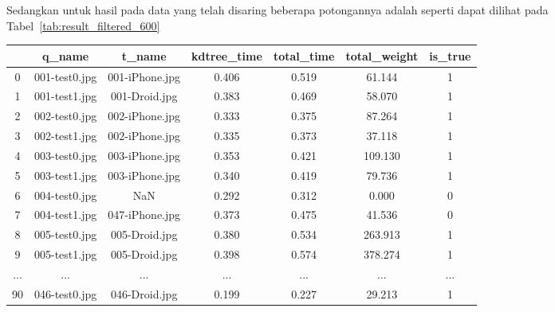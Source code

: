 Sedangkan untuk hasil pada data yang telah disaring beberapa potongannya adalah seperti dapat dilihat pada Tabel~\ref{tab:result_filtered_600}
\begin{table}[H]
	\centering
	\begin{tabular}{|c|c|c|c|c|c|c|} 
		\hline
		& \textbf{q\_name} & \textbf{t\_name} & \textbf{kdtree\_time} & \textbf{total\_time} & \textbf{total\_weight} & \textbf{is\_true}  \\ 
		\hline
		0   & 001-test0.jpg    & 001-iPhone.jpg   & 0.406                 & 0.519                & 61.144                 & 1                  \\ 
		\hline
		1   & 001-test1.jpg    & 001-Droid.jpg    & 0.383                 & 0.469                & 58.070                 & 1                  \\ 
		\hline
		2   & 002-test0.jpg    & 002-iPhone.jpg   & 0.333                 & 0.375                & 87.264                 & 1                  \\ 
		\hline
		3   & 002-test1.jpg    & 002-iPhone.jpg   & 0.335                 & 0.373                & 37.118                 & 1                  \\ 
		\hline
		4   & 003-test0.jpg    & 003-iPhone.jpg   & 0.353                 & 0.421                & 109.130                & 1                  \\ 
		\hline
		5   & 003-test1.jpg    & 003-iPhone.jpg   & 0.340                 & 0.419                & 79.736                 & 1                  \\ 
		\hline
		6   & 004-test0.jpg    & NaN              & 0.292                 & 0.312                & 0.000                  & 0                  \\ 
		\hline
		7   & 004-test1.jpg    & 047-iPhone.jpg   & 0.373                 & 0.475                & 41.536                 & 0                  \\ 
		\hline
		8   & 005-test0.jpg    & 005-Droid.jpg    & 0.380                 & 0.534                & 263.913                & 1                  \\ 
		\hline
		9   & 005-test1.jpg    & 005-Droid.jpg    & 0.398                 & 0.574                & 378.274                & 1                  \\ 
		\hline
		... & ...              & ...              & ...                   & ...                  & ...                    & ...                \\ 
		\hline
		90  & 046-test0.jpg    & 046-Droid.jpg    & 0.199                 & 0.227                & 29.213                 & 1                  \\ 

\end{tabular}
\end{table}
